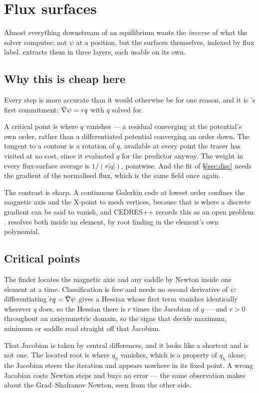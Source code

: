 \section{Flux surfaces}

Almost everything downstream of an equilibrium wants the \emph{inverse} of what
the solver computes: not $\psi$ at a position, but the surfaces themselves,
indexed by flux label. {\meq} extracts them in three layers, each usable on its
own.

\subsection{Why this is cheap here}

Every step is more accurate than it would otherwise be for one reason, and it is
's first commitment: $\bar{\nabla}\psi = rq$ with $q$ solved for.

A critical point is where $q$ vanishes --- a residual converging at the
potential's own order, rather than a differentiated potential converging an order
down. The tangent to a contour is a rotation of $q$, available at every point the
tracer has visited at no cost, since it evaluated $q$ for the predictor anyway.
The weight in every flux-surface average is $1/(r|q|)$, pointwise. And the fit of
\S\ref{sec:disc} needs the gradient of the normalised flux, which is the same
field once again.

The contrast is sharp. A continuous Galerkin code at lowest order confines the
magnetic axis and the X-point to mesh vertices, because that is where a discrete
gradient can be said to vanish, and CEDRES++ records this as an open problem
\cite{Heumann2015}. {\meq} resolves both inside an element, by root finding in
the element's own polynomial.

\subsection{Critical points}

The finder locates the magnetic axis and any saddle by Newton inside one element
at a time. Classification is free and needs no second derivative of $\psi$:
differentiating $rq = \bar{\nabla}\psi$ gives a Hessian whose first term vanishes
identically wherever $q$ does, so the Hessian there is $r$ times the Jacobian of
$q$ --- and $r > 0$ throughout an axisymmetric domain, so the signs that decide
maximum, minimum or saddle read straight off that Jacobian.

That Jacobian is taken by central differences, and it looks like a shortcut and
is not one. The located root is where $q_h$ vanishes, which is a property of
$q_h$ alone; the Jacobian steers the iteration and appears nowhere in its fixed
point. A wrong Jacobian costs Newton steps and buys no error --- the same
observation  makes about the Grad--Shafranov Newton, seen from
the other side.


